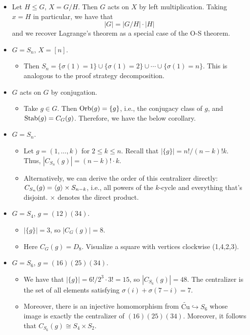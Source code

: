 \documentclass[../notes.tex]{subfiles}
\begin{document}
\begin{itemize}
\begin{itemize}
        \item Let $H\leq G$, $X=G/H$. Then $G$ acts on $X$ by left multiplication. Taking $x=H$ in particular, we have that
        \begin{equation*}
            |G| = |G/H|\cdot|H|
        \end{equation*}
        and we recover Lagrange's theorem as a special case of the O-S theorem.
        \item $G=S_n$, $X=[n]$.
        \begin{itemize}
            \item Then $S_n=\{\sigma(1)=1\}\cup\{\sigma(1)=2\}\cup\cdots\cup\{\sigma(1)=n\}$. This is analogous to the proof strategy decomposition.
        \end{itemize}
        \item $G$ acts on $G$ by conjugation.
        \begin{itemize}
            \item Take $g\in G$. Then $\operatorname{Orb}(g)=\{g\}$, i.e., the conjugacy class of $g$, and $\operatorname{Stab}(g)=C_G(g)$. Therefore, we have the below corollary.
        \end{itemize}
        \item $G=S_n$.
        \begin{itemize}
            \item Let $g=(1,\dots,k)$ for $2\leq k\leq n$. Recall that $|\{g\}|=n!/(n-k)!k$. Thus, $|C_{S_n}(g)|=(n-k)!\cdot k$.
            \item Alternatively, we can derive the order of this centralizer directly: $C_{S_n}(g)=\left\langle{g}\right\rangle\times S_{n-k}$, i.e., all powers of the $k$-cycle and everything that's disjoint. $\times$ denotes the direct product.
        \end{itemize}
        \item $G=S_4$, $g=(12)(34)$.
        \begin{itemize}
            \item $|\{g\}|=3$, so $|C_G(g)|=8$.
            \item Here $C_G(g)=D_8$. Visualize a square with vertices clockwise (1,4,2,3).
        \end{itemize}
        \item $G=S_6$, $g=(16)(25)(34)$.
        \begin{itemize}
            \item We have that $|\{g\}|=6!/2^3\cdot 3!=15$, so $|C_{S_6}(g)|=48$. The centralizer is the set of all elements satisfying $\sigma(i)+\sigma(7-i)=7$.
            \item Moreover, there is an injective homomorphism from $\widetilde{\text{Cu}}\hookrightarrow S_6$ whose image is exactly the centralizer of $(16)(25)(34)$. Moreover, it follows that $C_{S_6}(g)\cong S_4\times S_2$.

\end{itemize}
\end{itemize}
\end{itemize}
\end{document}
